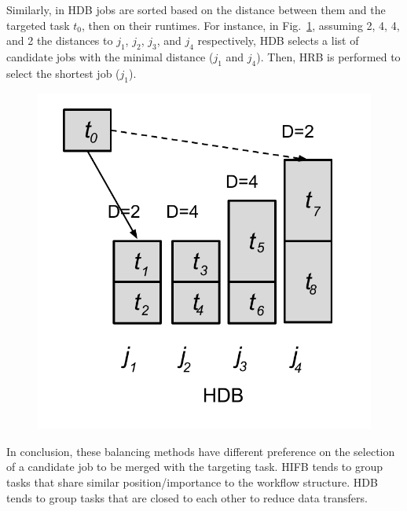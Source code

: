 Similarly, in HDB jobs are sorted based on the distance between them and the targeted task $t_0$, then on their runtimes. For instance, in Fig.~\ref{fig:imbalance_hdb}, assuming 2, 4, 4, and 2 the distances to $j_1$, $j_2$, $j_3$, and $j_4$ respectively, HDB selects a list of candidate jobs with the minimal distance ($j_1$ and $j_4$). Then, HRB is performed to select the shortest job ($j_1$). 

\begin{figure}[htb]
	\centering
	\includegraphics[width=0.5\linewidth]{figures/imbalance/algorithm_hdb.pdf}
	\label{fig:imbalance_hdb}
\end{figure}

In conclusion, these balancing methods have different preference on the selection of a candidate job to be merged with the targeting task. HIFB tends to group tasks that share similar position/importance to the workflow structure. HDB tends to group tasks that are closed to each other to reduce data transfers. 


